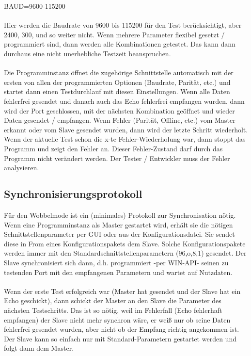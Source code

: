 \begin{center}
BAUD=9600-115200
\end{center}
\paragraph{}
Hier werden die Baudrate von 9600 bis 115200 für den Test berücksichtigt, aber 2400, 300, und so weiter nicht. Wenn mehrere Parameter flexibel gesetzt / programmiert sind, dann werden alle Kombinationen getestet. Das kann dann durchaus eine nicht unerhebliche Testzeit beanspruchen.
\paragraph{}
Die Programminstanz öffnet die zugehörige Schnittstelle automatisch mit der ersten von allen der programmierten Optionen (Baudrate, Parität, etc.) und startet dann einen Testdurchlauf mit diesen Einstellungen. Wenn alle Daten fehlerfrei gesendet und danach auch das Echo fehlerfrei empfangen wurden, dann wird der Port geschlossen, mit der nächsten Kombination geöffnet und wieder Daten gesendet / empfangen. Wenn Fehler (Parität, Offline, etc.) vom Master erkannt oder vom Slave gesendet wurden, dann wird der letzte Schritt wiederholt. Wenn der aktuelle Test schon die x-te Fehler-Wiederholung war, dann stoppt das Programm und zeigt den Fehler an. Dieser Fehler-Zustand darf durch das Programm nicht verändert werden. Der Tester / Entwickler muss der Fehler analysieren.

\subsection{Synchronisierungsprotokoll}
\paragraph{}
Für den Wobbelmode ist ein (minimales) Protokoll zur Synchronisation nötig. Wenn eine Programminstanz als Master gestartet wird, erhält sie die nötigen Schnittstellenparameter per GUI oder aus der Konfigurationsdatei. Sie sendet diese in From eines Konfigurationspakets dem Slave. Solche Konfigurationspakete werden immer mit den Standardschnittstellenparametern (96,o,8,1) gesendet. Der Slave synchronisiert sich dann, d.h. programmiert -per WIN-API- seinen zu testenden Port mit den empfangenen Parametern und wartet auf Nutzdaten.
\paragraph{}
Wenn der erste Test erfolgreich war (Master hat gesendet und der Slave hat ein Echo geschickt), dann schickt der Master an den Slave die Parameter des nächsten Testschritts. Das ist so nötig, weil im Fehlerfall (Echo fehlerhaft empfangen) der Slave nicht mehr synchron wäre, er weiß nur ob seine Daten fehlerfrei gesendet wurden, aber nicht ob der Empfang richtig angekommen ist. Der Slave kann so einfach nur mit Standard-Parametern gestartet werden und folgt dann dem Master.


